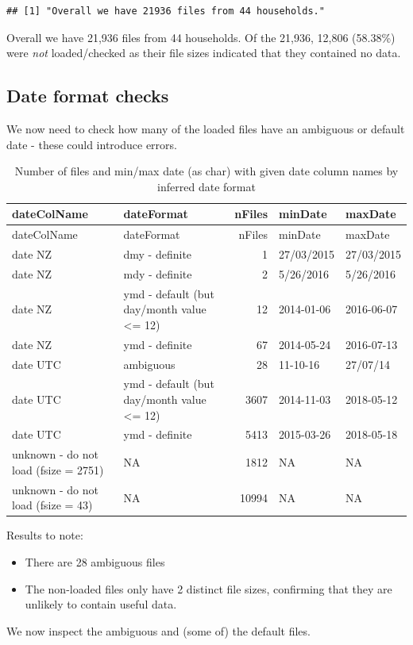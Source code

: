 \documentclass[]{article}
\providecommand{\tightlist}{%
  \setlength{\itemsep}{0pt}\setlength{\parskip}{0pt}}
\begin{document}
\begin{verbatim}
## [1] "Overall we have 21936 files from 44 households."
\end{verbatim}

Overall we have 21,936 files from 44 households. Of the 21,936, 12,806
(58.38\%) were \emph{not} loaded/checked as their file sizes indicated
that they contained no data.

\subsection{Date format checks}\label{date-format-checks}

We now need to check how many of the loaded files have an ambiguous or
default date - these could introduce errors.

\begin{longtable}[]{@{}llrll@{}}
\caption{Number of files and min/max date (as char) with given date
column names by inferred date format}\tabularnewline
\toprule
dateColName & dateFormat & nFiles & minDate & maxDate\tabularnewline
\midrule
\endfirsthead
\toprule
dateColName & dateFormat & nFiles & minDate & maxDate\tabularnewline
\midrule
\endhead
date NZ & dmy - definite & 1 & 27/03/2015 & 27/03/2015\tabularnewline
date NZ & mdy - definite & 2 & 5/26/2016 & 5/26/2016\tabularnewline
date NZ & ymd - default (but day/month value \textless{}= 12) & 12 &
2014-01-06 & 2016-06-07\tabularnewline
date NZ & ymd - definite & 67 & 2014-05-24 & 2016-07-13\tabularnewline
date UTC & ambiguous & 28 & 11-10-16 & 27/07/14\tabularnewline
date UTC & ymd - default (but day/month value \textless{}= 12) & 3607 &
2014-11-03 & 2018-05-12\tabularnewline
date UTC & ymd - definite & 5413 & 2015-03-26 &
2018-05-18\tabularnewline
unknown - do not load (fsize = 2751) & NA & 1812 & NA &
NA\tabularnewline
unknown - do not load (fsize = 43) & NA & 10994 & NA & NA\tabularnewline
\bottomrule
\end{longtable}

Results to note:

\begin{itemize}
\tightlist
\item
  There are 28 ambiguous files
\item
  The non-loaded files only have 2 distinct file sizes, confirming that
  they are unlikely to contain useful data.
\end{itemize}

We now inspect the ambiguous and (some of) the default files.
\end{document}
